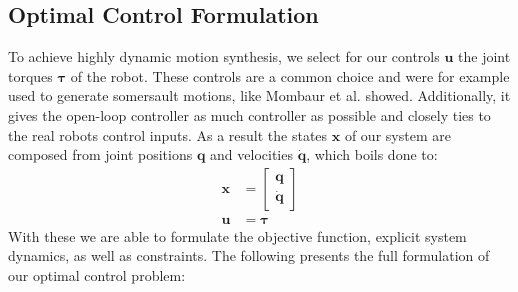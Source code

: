 \subsection{Optimal Control Formulation} \label{sec:morpheus:formulation}
To achieve highly dynamic motion synthesis, we select for our controls $\bm u$ the joint torques $\bm \tau$ of the robot.
These controls are a common choice and were for example used to generate somersault motions, like Mombaur et al. \cite{mombaur_2005} showed.
Additionally, it gives the open-loop controller as much controller as possible and closely ties to the real robots control inputs.
As a result the states $\bm x$ of our system are composed from joint positions $\bm q$ and velocities $\bm{\dot q}$, which boils done to:
\begin{subequations}
  \label{eq:morpheus:dyn}
  \begin{align}
    \bm x &=
    \begin{bmatrix}
      \bm{q} \\ \bm{\dot q}
    \end{bmatrix} \label{eq:morpheus:dyn:x} \\
    \bm u &=
    \bm{\tau} \label{eq:morpheus:dyn:u}
  \end{align}
\end{subequations}
With these we are able to formulate the objective function, explicit system dynamics, as well as constraints.
The following presents the full formulation of our optimal control problem:
